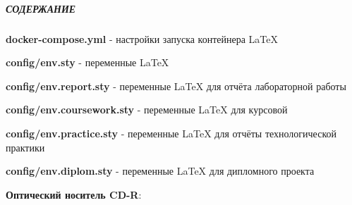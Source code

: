 \documentclass[12pt, a4paper, simple]{eskdtext}
\begin{document}
  

  \thispagestyle{fancyStyleWithCodeOnTopFirstPage}
  \pagestyle{fancyStyleWithCodeOnTop}

  \subparagraph{СОДЕРЖАНИЕ} \hspace{0pt}

  \textbf{docker-compose.yml} - настройки запуска контейнера LaTeX

  \textbf{config/env.sty} - переменные LaTeX

  \textbf{config/env.report.sty} - переменные LaTeX для отчёта лабораторной работы

  \textbf{config/env.coursework.sty} - переменные LaTeX для курсовой

  \textbf{config/env.practice.sty} - переменные LaTeX для отчёты технологической практики

  \textbf{config/env.diplom.sty} - переменные LaTeX для дипломного проекта

  \newpage
  \textbf{Оптический носитель CD-R}:
\end{document}
